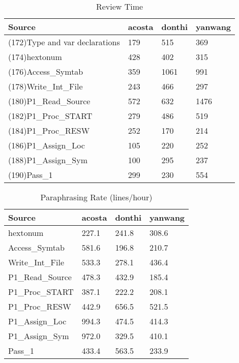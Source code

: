\begin{table}[hb]
\begin{center}
\begin{tabular}{|l|l|l|l|}
\hline
Source & acosta & donthi & yanwang\\
\hline
(172)Type and var declarations & 179 & 515 & 369\\
(174)hextonum & 428 & 402 & 315\\
(176)Access\_Symtab & 359 & 1061 & 991\\
(178)Write\_Int\_File & 243 & 466 & 297\\
(180)P1\_Read\_Source & 572 & 632 & 1476\\
(182)P1\_Proc\_START & 279 & 486 & 519\\
(184)P1\_Proc\_RESW & 252 & 170 & 214\\
(186)P1\_Assign\_Loc & 105 & 220 & 252\\
(188)P1\_Assign\_Sym & 100 & 295 & 237\\
(190)Pass\_1 & 299 & 230 & 554\\
\hline
\end{tabular}
\end{center}
\caption{Review Time}
\end{table}

\begin{table}[hb]
\begin{center}
\begin{tabular}{|l|l|l|l|}
\hline
Source & acosta & donthi & yanwang\\
\hline
hextonum & 227.1 & 241.8 & 308.6\\
Access\_Symtab & 581.6 & 196.8 & 210.7\\
Write\_Int\_File & 533.3 & 278.1 & 436.4\\
P1\_Read\_Source & 478.3 & 432.9 & 185.4\\
P1\_Proc\_START & 387.1 & 222.2 & 208.1\\
P1\_Proc\_RESW & 442.9 & 656.5 & 521.5\\
P1\_Assign\_Loc & 994.3 & 474.5 & 414.3\\
P1\_Assign\_Sym & 972.0 & 329.5 & 410.1\\
Pass\_1 & 433.4 & 563.5 & 233.9\\
\hline
\end{tabular}
\end{center}
\caption{Paraphrasing Rate (lines/hour)}
\end{table}

